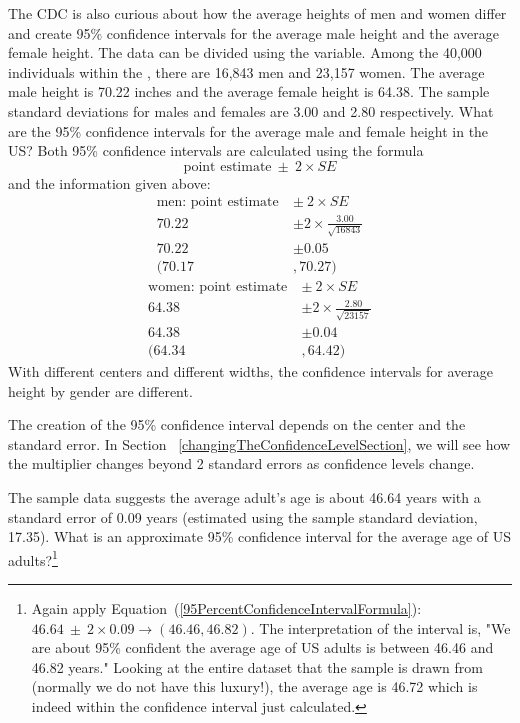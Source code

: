 \begin{example}{The CDC is also curious about how the average heights of men and women differ and create 95\% confidence intervals for the average male height and the average female height. The  data can be divided using the  variable. Among the 40,000 individuals within the , there are 16,843 men and 23,157 women. The average male height is 70.22 inches and the average female height is 64.38. The sample standard deviations for males and females  are 3.00 and 2.80 respectively. What are the 95\% confidence intervals for the average male and female height in the US? }\label{CIforGenderHeight}
Both 95\% confidence intervals are calculated using the formula \[\text{point estimate}\ \pm\ 2 \times SE\] and the information given above: 
\begin{align*}
\text{men: point estimate}\ &\pm\ 2 \times SE\\
70.22 &\pm 2\times \frac{3.00}{\sqrt{16843}}\\
70.22 &\pm  0.05 \\
(70.17 &, 70.27)
\end{align*}
\begin{align*}
\text{women: point estimate}\ &\pm\ 2 \times SE\\
64.38 &\pm 2\times \frac{2.80}{\sqrt{23157}}\\
64.38 &\pm  0.04\\
(64.34 &, 64.42)
\end{align*}
With different centers and different widths, the confidence intervals for average height by gender are different.  
\end{example}

The creation of the 95\% confidence interval depends on the center and the standard error. In Section ~\ref{changingTheConfidenceLevelSection}, we will see how the multiplier changes beyond 2 standard errors as confidence levels change. 

\begin{exercise} \label{95CIExerciseForBRFSSAge}
The sample data  suggests the average adult's age is about 46.64 years with a standard error of 0.09 years (estimated using the sample standard deviation, 17.35). What is an approximate 95\% confidence interval for the average age of US adults?\footnote{Again apply Equation~(\ref{95PercentConfidenceIntervalFormula}): $46.64 \ \pm \ 2\times 0.09 \rightarrow (46.46, 46.82)$. The interpretation of the interval is, "We are about 95\% confident the average age of US adults is between 46.46 and 46.82 years." Looking at the entire  dataset that the  sample is drawn from (normally we do not have this luxury!), the average age is 46.72 which is indeed within the confidence interval just calculated.}
\end{exercise}

